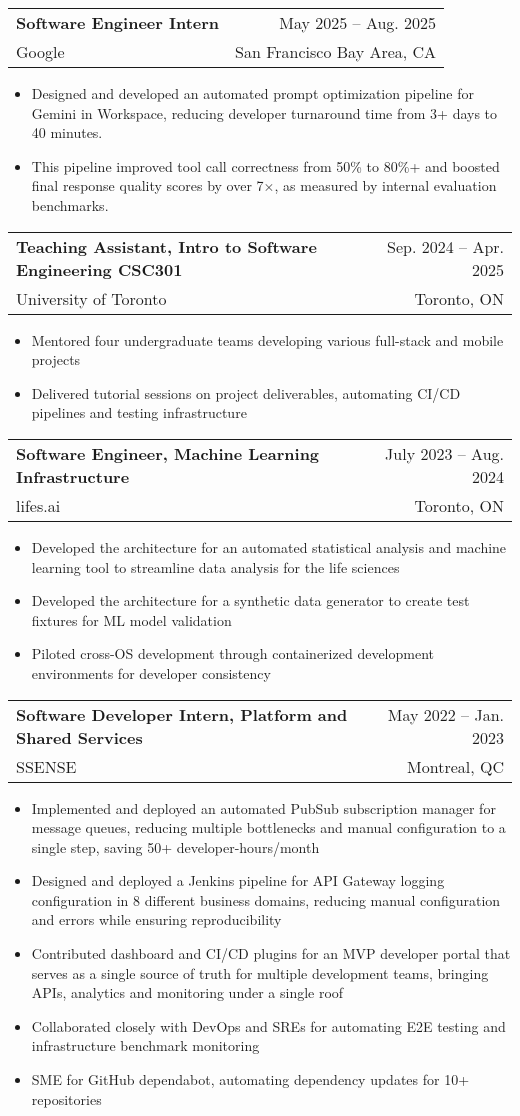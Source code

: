 \documentclass[letterpaper,11pt]{article}
\makeatletter
\newcommand{\resumeItem}[1]{
  \item\small{
    {#1 \vspace{-2pt}}
  }
}
\newcommand{\resumeSubheading}[4]{
  \vspace{-2pt}\item
    \begin{tabular*}{0.97\textwidth}[t]{l@{\extracolsep{\fill}}r}
      \textbf{#1} & #2 \\
      \small{#3} & \small{#4} \\
    \end{tabular*}\vspace{-7pt}
}
\newcommand{\resumeSubSubheading}[2]{
    \item
    \begin{tabular*}{0.97\textwidth}{l@{\extracolsep{\fill}}r}
      \textit{\small#1} & \small #2 \\
    \end{tabular*}\vspace{-7pt}
}
\newcommand{\resumeSubHeadingListEnd}{\end{itemize}}
\newcommand{\resumeItemListStart}{\begin{itemize}}
\newcommand{\resumeItemListEnd}{\end{itemize}\vspace{-5pt}}
\makeatother
\begin{document}
    \resumeSubheading
      {Software Engineer Intern}{May 2025 -- Aug. 2025}
      {Google}{San Francisco Bay Area, CA}
      \resumeItemListStart
        \resumeItem{Designed and developed an automated prompt optimization pipeline for Gemini in Workspace, reducing developer turnaround time from 3+ days to 40 minutes.}
        \resumeItem{This pipeline improved tool call correctness from 50\% to 80\%+ and boosted final response quality scores by over 7$\times$, as measured by internal evaluation benchmarks.}
      \resumeItemListEnd

    \resumeSubheading
      {Teaching Assistant, Intro to Software Engineering CSC301}{Sep. 2024 -- Apr. 2025}
      {University of Toronto}{Toronto, ON}
      \resumeItemListStart
        \resumeItem{Mentored four undergraduate teams developing various full-stack and mobile projects}
        \resumeItem{Delivered tutorial sessions on project deliverables, automating CI/CD pipelines and testing infrastructure}
      \resumeItemListEnd
      

    \resumeSubheading
      {Software Engineer, Machine Learning Infrastructure}{July 2023 -- Aug. 2024}
      {lifes.ai}{Toronto, ON}
      \resumeItemListStart
        \resumeItem{Developed the architecture for an automated statistical analysis and machine learning tool to streamline data analysis for the life sciences}
        \resumeItem{Developed the architecture for a synthetic data generator to create test fixtures for ML model validation}
        \resumeItem{Piloted cross-OS development through containerized development environments for developer consistency}
    \resumeItemListEnd

    \resumeSubheading
      {Software Developer Intern, Platform and Shared Services}{May 2022 -- Jan. 2023}
      {SSENSE}{Montreal, QC}
      \resumeItemListStart
        \resumeItem{Implemented and deployed an automated PubSub subscription manager for message queues, reducing multiple bottlenecks and manual configuration to a single step, saving 50+ developer-hours/month}
        \resumeItem{Designed and deployed a Jenkins pipeline for API Gateway logging configuration in 8 different business domains, reducing manual configuration and errors while ensuring reproducibility}
        \resumeItem{Contributed dashboard and CI/CD plugins for an MVP developer portal that serves as a single source of truth for multiple development teams, bringing APIs, analytics and monitoring under a single roof}
        \resumeItem{Collaborated closely with DevOps and SREs for automating E2E testing and infrastructure benchmark monitoring}
        \resumeItem{SME for GitHub dependabot, automating dependency updates for 10+ repositories}
      \resumeItemListEnd
    
\end{document}
